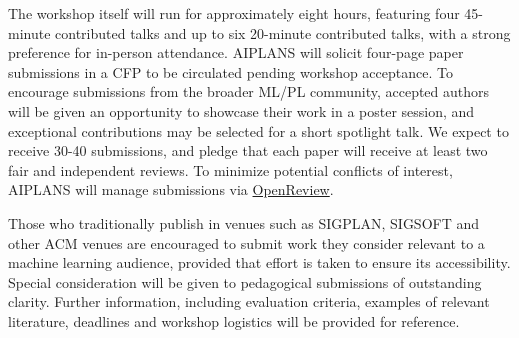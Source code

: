 \documentclass{article}
\begin{document}

    The workshop itself will run for approximately eight hours, featuring four 45-minute contributed talks and up to six 20-minute contributed talks, with a strong preference for in-person attendance. AIPLANS will solicit four-page paper submissions in a CFP to be circulated pending workshop acceptance. To encourage submissions from the broader ML/PL community, accepted authors will be given an opportunity to showcase their work in a poster session, and exceptional contributions may be selected for a short spotlight talk. We expect to receive 30-40 submissions, and pledge that each paper will receive at least two fair and independent reviews. To minimize potential conflicts of interest, AIPLANS will manage submissions via \href{https://openreview.net}{OpenReview}.


    Those who traditionally publish in venues such as SIGPLAN, SIGSOFT and other ACM venues are encouraged to submit work they consider relevant to a machine learning audience, provided that effort is taken to ensure its accessibility. Special consideration will be given to pedagogical submissions of outstanding clarity. Further information, including evaluation criteria, examples of relevant literature, deadlines and workshop logistics will be provided for reference.

\end{document}
